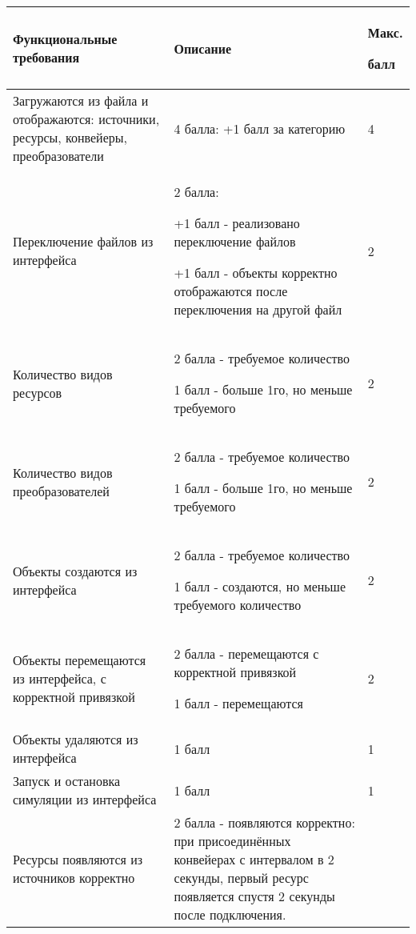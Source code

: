 \newpage

\markSection

\begin{tabular}{|p{4cm}|p{9cm}|p{1cm}|} 
    \hline
    Функциональные требования & Описание & Макс.
    
    балл \\	
    \hline

    \hline

    Загружаются из файла и отображаются: источники, ресурсы, конвейеры, преобразователи	& 4 балла: 
+1 балл за категорию & 4 \\
    \hline

    Переключение файлов из интерфейса & 2 балла:

    +1 балл - реализовано переключение файлов

    +1 балл - объекты корректно отображаются после переключения на другой файл & 2 \\
    \hline

    Количество видов ресурсов & 2 балла - требуемое количество

    1 балл - больше 1го, но меньше требуемого & 2 \\
    \hline

    
    Количество видов преобразователей & 2 балла - требуемое количество
    
    1 балл - больше 1го, но меньше требуемого & 2 \\
    \hline


    Объекты создаются из интерфейса	& 2 балла - требуемое количество
    
    1 балл - создаются, но меньше требуемого количество & 2 \\
    \hline

    Объекты перемещаются из интерфейса, с корректной привязкой & 2 балла - перемещаются с корректной привязкой

    1 балл - перемещаются & 2 \\
    \hline

    Объекты удаляются из интерфейса & 1 балл & 1 \\
    \hline


    Запуск и остановка симуляции из интерфейса & 1 балл & 1 \\ 
    \hline

    Ресурсы появляются из источников корректно & 2 балла - появляются корректно: при присоединённых конвейерах с интервалом в 2 секунды, первый ресурс появляется спустя 2 секунды после подключения.



\end{tabular}

